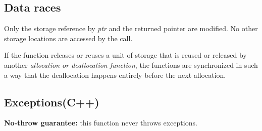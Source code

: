 \subsection{Data races}
Only the storage reference by \textit{ptr} and the returned pointer are modified. No other storage locations are accessed by the call.

If the function releases or reuses a unit of storage that is reused or released by another \textit{allocation or deallocation function}, the functions are synchronized in such a way that the deallocation happens entirely before the next allocation.

\subsection{Exceptions(C++)}
\textbf{No-throw guarantee:} this function never throws exceptions.
